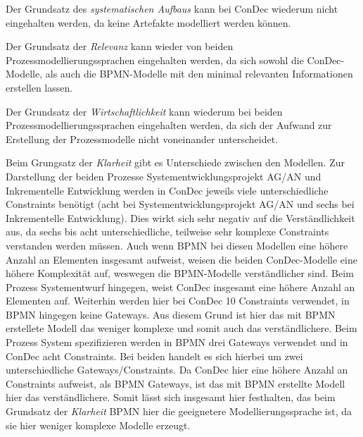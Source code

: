 Der  Grundsatz des \textit{systematischen Aufbaus} kann bei ConDec wiederum nicht eingehalten werden, da keine Artefakte modelliert werden können.\newline

Der Grundsatz der \textit{Relevanz} kann wieder von beiden Prozessmodellierungssprachen eingehalten werden, da sich sowohl die ConDec-Modelle, als auch die BPMN-Modelle mit den minimal relevanten Informationen erstellen lassen.\newline

Der Grundsatz der \textit{Wirtschaftlichkeit} kann wiederum bei beiden Prozessmodellierungssprachen eingehalten werden, da sich der Aufwand zur Erstellung der Prozessmodelle nicht voneinander unterscheidet. 


Beim Grungsatz der \textit{Klarheit} gibt es Unterschiede zwischen den Modellen. Zur Darstellung der beiden Prozesse Systementwicklungsprojekt AG/AN und Inkrementelle Entwicklung werden in ConDec jeweils viele unterschiedliche Constraints benötigt (acht bei Systementwicklungsprojekt AG/AN und sechs bei Inkrementelle Entwicklung). Dies wirkt sich sehr negativ auf die Verständlichkeit aus, da sechs bis acht unterschiedliche, teilweise sehr komplexe Constraints verstanden werden müssen. Auch wenn BPMN bei diesen Modellen eine höhere Anzahl an Elementen insgesamt aufweist, weisen die beiden ConDec-Modelle eine höhere Komplexität auf, weswegen die BPMN-Modelle verständlicher sind. \newline
Beim Prozess Systementwurf hingegen, weist ConDec  insgesamt eine höhere Anzahl an Elementen auf. Weiterhin werden hier bei ConDec 10 Constraints verwendet, in BPMN hingegen keine Gateways. Aus diesem Grund ist hier das mit BPMN erstellete Modell das weniger komplexe und somit auch das verständlichere.\newline
Beim Prozess System spezifizieren werden in BPMN drei Gateways verwendet und in ConDec acht Constraints. Bei beiden handelt es sich hierbei um zwei unterschiedliche Gateways/Constraints. Da ConDec hier eine höhere Anzahl an Constraints aufweist, als BPMN Gateways, ist das mit BPMN erstellte Modell hier das verständlichere. \newline
Somit lässt sich insgesamt hier festhalten, das beim Grundsatz der \textit{Klarheit} BPMN hier die geeignetere Modellierungssprache ist, da sie hier weniger komplexe Modelle erzeugt.\newline

